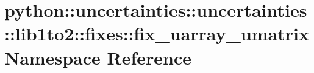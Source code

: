 \hypertarget{namespacepython_1_1uncertainties_1_1uncertainties_1_1lib1to2_1_1fixes_1_1fix__uarray__umatrix}{
\section{python::uncertainties::uncertainties::lib1to2::fixes::fix\_\-uarray\_\-umatrix Namespace Reference}
\label{namespacepython_1_1uncertainties_1_1uncertainties_1_1lib1to2_1_1fixes_1_1fix__uarray__umatrix}
}
